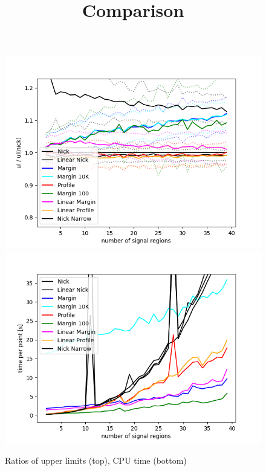 \documentclass[11pt,singleside,a4paper,makeidx,notitlepage]{article}
\begin{document}
\title{Comparison}

\begin{figure}[h!t]
\includegraphics[width=420pt]{comp.png}
\includegraphics[width=420pt]{t.png}
\caption{Ratios of upper limits (top), CPU time (bottom)}
\end{figure}
\end{document}
